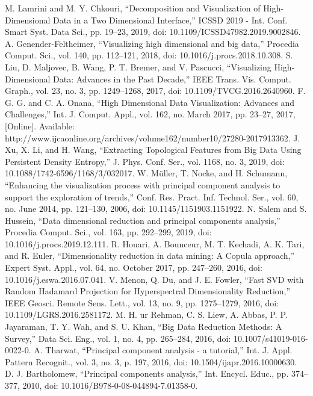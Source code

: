 \documentclass[conference]{IEEEtran}
\begin{document}
\begin{thebibliography}{00}
 M. Lamrini and M. Y. Chkouri, “Decomposition and Visualization of High-Dimensional Data in a Two Dimensional Interface,” ICSSD 2019 - Int. Conf. Smart Syst. Data Sci., pp. 19–23, 2019, doi: 10.1109/ICSSD47982.2019.9002846.
 A. Genender-Feltheimer, “Visualizing high dimensional and big data,” Procedia Comput. Sci., vol. 140, pp. 112–121, 2018, doi: 10.1016/j.procs.2018.10.308.
 S. Liu, D. Maljovec, B. Wang, P. T. Bremer, and V. Pascucci, “Visualizing High-Dimensional Data: Advances in the Past Decade,” IEEE Trans. Vis. Comput. Graph., vol. 23, no. 3, pp. 1249–1268, 2017, doi: 10.1109/TVCG.2016.2640960.
 F. G. G. and C. A. Onana, “High Dimensional Data Visualization: Advances and Challenges,” Int. J. Comput. Appl., vol. 162, no. March 2017, pp. 23–27, 2017, [Online]. Available: http://www.ijcaonline.org/archives/volume162/number10/27280-2017913362.
 J. Xu, X. Li, and H. Wang, “Extracting Topological Features from Big Data Using Persistent Density Entropy,” J. Phys. Conf. Ser., vol. 1168, no. 3, 2019, doi: 10.1088/1742-6596/1168/3/032017.
 W. Müller, T. Nocke, and H. Schumann, “Enhancing the visualization process with principal component analysis to support the exploration of trends,” Conf. Res. Pract. Inf. Technol. Ser., vol. 60, no. June 2014, pp. 121–130, 2006, doi: 10.1145/1151903.1151922.
 N. Salem and S. Hussein, “Data dimensional reduction and principal components analysis,” Procedia Comput. Sci., vol. 163, pp. 292–299, 2019, doi: 10.1016/j.procs.2019.12.111.
 R. Houari, A. Bounceur, M. T. Kechadi, A. K. Tari, and R. Euler, “Dimensionality reduction in data mining: A Copula approach,” Expert Syst. Appl., vol. 64, no. October 2017, pp. 247–260, 2016, doi: 10.1016/j.eswa.2016.07.041.
 V. Menon, Q. Du, and J. E. Fowler, “Fast SVD with Random Hadamard Projection for Hyperspectral Dimensionality Reduction,” IEEE Geosci. Remote Sens. Lett., vol. 13, no. 9, pp. 1275–1279, 2016, doi: 10.1109/LGRS.2016.2581172.
 M. H. ur Rehman, C. S. Liew, A. Abbas, P. P. Jayaraman, T. Y. Wah, and S. U. Khan, “Big Data Reduction Methods: A Survey,” Data Sci. Eng., vol. 1, no. 4, pp. 265–284, 2016, doi: 10.1007/s41019-016-0022-0.
 A. Tharwat, “Principal component analysis - a tutorial,” Int. J. Appl. Pattern Recognit., vol. 3, no. 3, p. 197, 2016, doi: 10.1504/ijapr.2016.10000630.
 D. J. Bartholomew, “Principal components analysis,” Int. Encycl. Educ., pp. 374–377, 2010, doi: 10.1016/B978-0-08-044894-7.01358-0.

\end{thebibliography}
\end{document}

